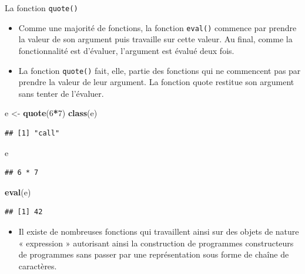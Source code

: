 \documentclass[
  ignorenonframetext,
]{beamer}
\newenvironment{Shaded}{\begin{snugshade}}{\end{snugshade}}
\newcommand{\DecValTok}[1]{\textcolor[rgb]{0.00,0.00,0.81}{#1}}
\newcommand{\FunctionTok}[1]{\textcolor[rgb]{0.13,0.29,0.53}{\textbf{#1}}}
\newcommand{\NormalTok}[1]{#1}
\newcommand{\OtherTok}[1]{\textcolor[rgb]{0.56,0.35,0.01}{#1}}
\newcommand{\SpecialCharTok}[1]{\textcolor[rgb]{0.81,0.36,0.00}{\textbf{#1}}}
\providecommand{\tightlist}{%
  \setlength{\itemsep}{0pt}\setlength{\parskip}{0pt}}
\begin{document}
\begin{frame}[fragile]{La fonction \texttt{quote()}}
\protect\hypertarget{la-fonction-quote}{}
\begin{itemize}
\tightlist
\item
  Comme une majorité de fonctions, la fonction \texttt{eval()} commence
  par prendre la valeur de son argument puis travaille sur cette valeur.
  Au final, comme la fonctionnalité est d'évaluer, l'argument est évalué
  deux fois.
\item
  La fonction \texttt{quote()} fait, elle, partie des fonctions qui ne
  commencent pas par prendre la valeur de leur argument. La fonction
  quote restitue son argument sans tenter de l'évaluer.
\end{itemize}

\tiny

\begin{Shaded}
\begin{Highlighting}[]
\NormalTok{e }\OtherTok{\textless{}{-}} \FunctionTok{quote}\NormalTok{(}\DecValTok{6}\SpecialCharTok{*}\DecValTok{7}\NormalTok{)}
\FunctionTok{class}\NormalTok{(e)}
\end{Highlighting}
\end{Shaded}

\begin{verbatim}
## [1] "call"
\end{verbatim}

\normalsize

\tiny

\begin{Shaded}
\begin{Highlighting}[]
\NormalTok{e}
\end{Highlighting}
\end{Shaded}

\begin{verbatim}
## 6 * 7
\end{verbatim}

\normalsize

\tiny

\begin{Shaded}
\begin{Highlighting}[]
\FunctionTok{eval}\NormalTok{(e)}
\end{Highlighting}
\end{Shaded}

\begin{verbatim}
## [1] 42
\end{verbatim}

\normalsize

\begin{itemize}
\tightlist
\item
  Il existe de nombreuses fonctions qui travaillent ainsi sur des objets
  de nature « expression » autorisant ainsi la construction de
  programmes constructeurs de programmes sans passer par une
  représentation sous forme de chaîne de caractères.
\end{itemize}
\end{frame}
\end{document}
